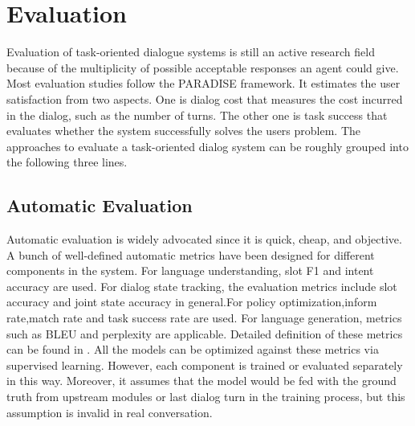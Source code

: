 \documentclass[10pt,twocolumn,letterpaper]{article}
\begin{document}
\section{Evaluation}

Evaluation of task-oriented dialogue systems is still an active research field because of the multiplicity of possible acceptable responses an agent could give. Most evaluation studies follow  the  PARADISE \cite{walker1997paradise}  framework. It estimates the user satisfaction from two aspects. One is dialog cost that measures the cost incurred in the dialog, such as the number of turns. The other one is task success that evaluates whether the system successfully solves the users problem.   The approaches to evaluate a task-oriented  dialog  system  can  be roughly grouped into the following three lines.
\subsection{Automatic Evaluation}
Automatic evaluation is widely advocated since it is quick, cheap, and objective. A bunch of well-defined automatic metrics have been designed for different components in the system. For language understanding, slot F1 and intent accuracy are used. For dialog state tracking, the evaluation metrics include slot accuracy and joint state accuracy in general.For policy optimization,inform rate,match rate and task success rate are used. For language generation, metrics such as BLEU and perplexity are applicable. Detailed definition of these metrics can be found in \cite{takanobu2020your}. All the models can be optimized against these metrics via supervised learning. However, each component is trained or evaluated separately in this way. Moreover, it assumes that the model would be fed with the ground truth from upstream modules or last dialog turn in the training process, but this assumption is invalid in real conversation.
\end{document}
